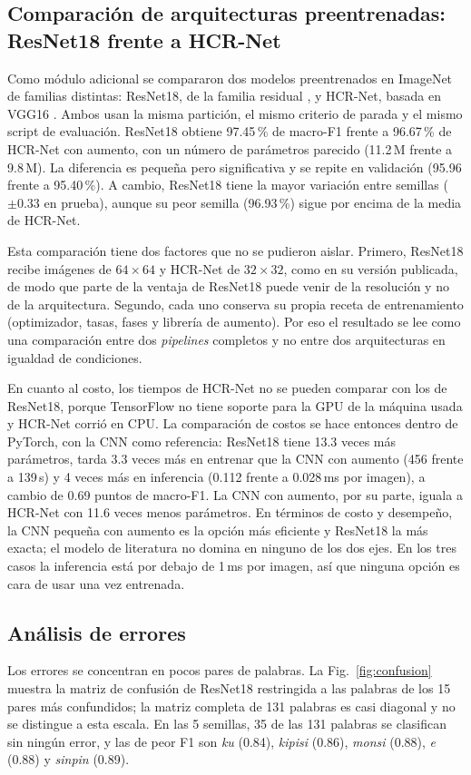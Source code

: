 \documentclass[conference]{IEEEtran}
\begin{document}
\subsection{Comparación de arquitecturas preentrenadas: ResNet18 frente a HCR-Net}
Como módulo adicional se compararon dos modelos preentrenados en ImageNet de
familias distintas: ResNet18, de la familia residual \cite{he_resnet_2016},
y HCR-Net, basada en VGG16 \cite{hcrnet_2024}. Ambos usan la misma partición,
el mismo criterio de parada y el mismo script de evaluación. ResNet18 obtiene
97.45\,\% de macro-F1 frente a 96.67\,\% de HCR-Net con aumento, con un
número de parámetros parecido (11.2\,M frente a 9.8\,M). La diferencia es
pequeña pero significativa y se repite en validación (95.96 frente a
95.40\,\%). A cambio, ResNet18 tiene la mayor variación entre semillas
($\pm0.33$ en prueba), aunque su peor semilla (96.93\,\%) sigue por encima de
la media de HCR-Net.

Esta comparación tiene dos factores que no se pudieron aislar. Primero,
ResNet18 recibe imágenes de $64\times64$ y HCR-Net de $32\times32$, como en
su versión publicada, de modo que parte de la ventaja de ResNet18 puede venir
de la resolución y no de la arquitectura. Segundo, cada uno conserva su
propia receta de entrenamiento (optimizador, tasas, fases y librería de
aumento). Por eso el resultado se lee como una comparación entre dos
\textit{pipelines} completos y no entre dos arquitecturas en igualdad de
condiciones.

En cuanto al costo, los tiempos de HCR-Net no se pueden comparar con los de
ResNet18, porque TensorFlow no tiene soporte para la GPU de la máquina usada
y HCR-Net corrió en CPU. La comparación de costos se hace entonces dentro de
PyTorch, con la CNN como referencia: ResNet18 tiene 13.3 veces más parámetros,
tarda 3.3 veces más en entrenar que la CNN con aumento (456 frente a 139\,s)
y 4 veces más en inferencia (0.112 frente a 0.028\,ms por imagen), a cambio
de 0.69 puntos de macro-F1. La CNN con aumento, por su parte, iguala a HCR-Net
con 11.6 veces menos parámetros. En términos de costo y desempeño, la CNN
pequeña con aumento es la opción más eficiente y ResNet18 la más exacta; el
modelo de literatura no domina en ninguno de los dos ejes. En los tres casos
la inferencia está por debajo de 1\,ms por imagen, así que ninguna opción es
cara de usar una vez entrenada.

\subsection{Análisis de errores}
\label{sec:errores}
Los errores se concentran en pocos pares de palabras. La Fig.~\ref{fig:confusion}
muestra la matriz de confusión de ResNet18 restringida a las palabras de los
15 pares más confundidos; la matriz completa de 131 palabras es casi
diagonal y no se distingue a esta escala. En las 5 semillas, 35 de las 131
palabras se clasifican sin ningún error, y las de peor F1 son \textit{ku}
(0.84), \textit{kipisi} (0.86), \textit{monsi} (0.88), \textit{e} (0.88) y
\textit{sinpin} (0.89).
\end{document}
